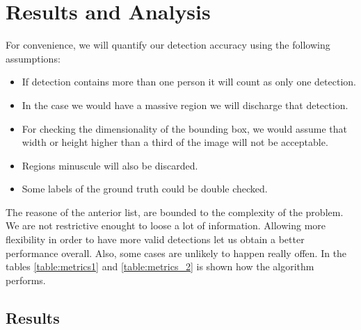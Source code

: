 \documentclass[11pt]{article}
\begin{document}


\section{Results and Analysis}

For convenience, we will quantify our detection accuracy using the following assumptions:

\begin{itemize}
  \item If detection contains more than one person it will count as only one detection.
  \item In the case we would have a massive region we will discharge that detection.
  \item For checking the dimensionality of the bounding box, we would assume that width or height higher than a third of the image will not be acceptable.
  \item Regions minuscule will also be discarded.
  \item Some labels of the ground truth could be double checked.
\end{itemize}

The reasone of the anterior list, are bounded to the complexity of the problem. We are not restrictive enought to loose a lot of information. Allowing more flexibility in order to have more valid detections let us obtain a better performance overall. Also, some cases are unlikely to happen really offen. In the tables \ref{table:metrics1} and \ref{table:metrics_2} is shown how the algorithm performs.

\subsection*{Results}
\end{document}
